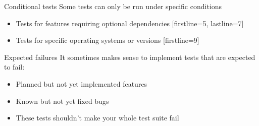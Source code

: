 \begin{frame}[c, fragile]{Conditional tests}
  Some tests can only be run under specific conditions
    \begin{itemize}
      \item Tests for features requiring optional dependencies
        [firstline=5, lastline=7]
      \item Tests for specific operating systems or versions
        [firstline=9]
    \end{itemize}
\end{frame}

\begin{frame}[c, fragile]{Expected failures}
  It sometimes makes sense to implement tests that are expected to fail:
  \begin{itemize}
    \item Planned but not yet implemented features
    \item Known but not yet fixed bugs
    \item These tests shouldn't make your whole test suite fail
  \end{itemize}

\end{frame}

